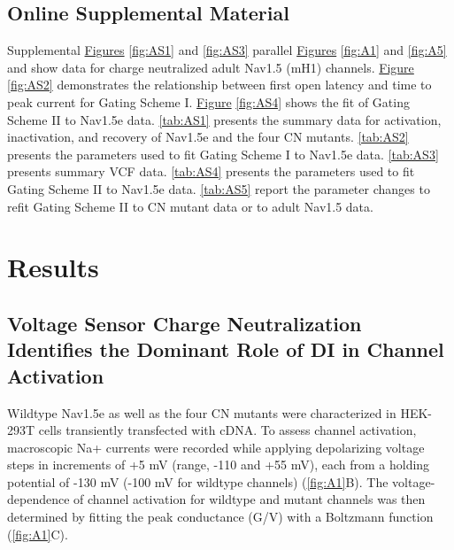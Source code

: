 \subsection{Online Supplemental Material}
Supplemental \hyperref[fig:AS1]{Figures} \ref{fig:AS1} and \ref{fig:AS3} parallel  \hyperref[fig:A1]{Figures} \ref{fig:A1} and \ref{fig:A5} and show data for charge neutralized adult Nav1.5 (mH1) channels.  \hyperref[fig:AS2]{Figure} \ref{fig:AS2} demonstrates the relationship between first open latency and time to peak current for Gating Scheme I. \hyperref[fig:AS4]{Figure} \ref{fig:AS4} shows the fit of Gating Scheme II to Nav1.5e data. \autoref{tab:AS1} presents the summary data for activation, inactivation, and recovery of Nav1.5e and the four CN mutants. \autoref{tab:AS2} presents the parameters used to fit Gating Scheme I to Nav1.5e data. \autoref{tab:AS3} presents summary VCF data. \autoref{tab:AS4} presents the parameters used to fit Gating Scheme II to Nav1.5e data. \autoref{tab:AS5} report the parameter changes to refit Gating Scheme II to CN mutant data or to adult Nav1.5 data.

\section{Results}
\subsection{Voltage Sensor Charge Neutralization Identifies the Dominant Role of DI in Channel Activation}
Wildtype Nav1.5e as well as the four CN mutants were characterized in HEK-293T cells transiently transfected with cDNA. To assess channel activation, macroscopic Na+ currents were recorded while applying depolarizing voltage steps in increments of +5 mV (range, -110 and +55 mV), each from a holding potential of -130 mV (-100 mV for wildtype channels) (\autoref{fig:A1}B). The voltage-dependence of channel activation for wildtype and mutant channels was then determined by fitting the peak conductance (G/V) with a Boltzmann function (\autoref{fig:A1}C). 

